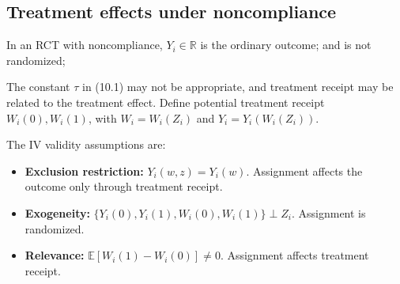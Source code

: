 \subsection{Treatment effects under noncompliance}
In an RCT with noncompliance, $Y_i\in\mathbb R$ is the ordinary outcome;  and is not randomized; 

The constant $\tau$ in (10.1) may not be appropriate, and treatment receipt may be related to the treatment effect. Define potential treatment receipt $W_i(0),W_i(1)$, with $W_i=W_i(Z_i)$ and $Y_i=Y_i(W_i(Z_i))$.

The IV validity assumptions are:
\begin{itemize}
 \item \textbf{Exclusion restriction:} $Y_i(w,z)=Y_i(w)$. Assignment affects the outcome only through treatment receipt.
 \item \textbf{Exogeneity:} $\{Y_i(0),Y_i(1),W_i(0),W_i(1)\}\perp Z_i$. Assignment is randomized.
 \item \textbf{Relevance:} $\mathbb E[W_i(1)-W_i(0)]\ne0$. Assignment affects treatment receipt.
\end{itemize}

